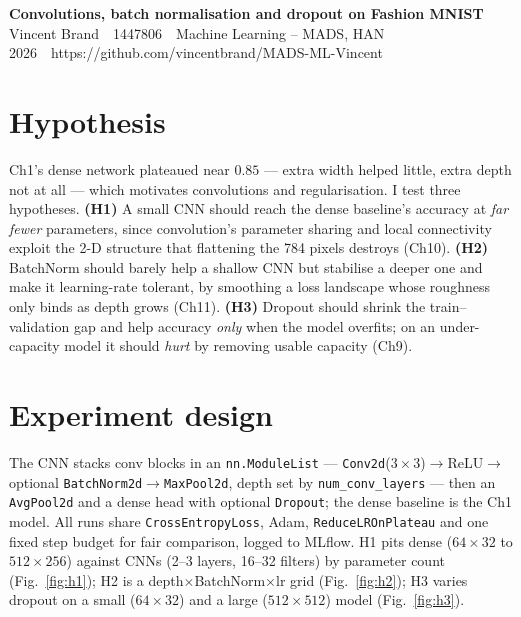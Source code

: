 \documentclass[11pt,a4paper]{article}
\newcommand{\studentname}{Vincent Brand}
\newcommand{\studentnumber}{1447806}
\newcommand{\course}{Machine Learning -- MADS, HAN}
\newcommand{\reportdate}{2026}
\newcommand{\repourl}{https://github.com/vincentbrand/MADS-ML-Vincent}
\begin{document}
\begin{center}
  {\Large\bfseries Convolutions, batch normalisation and dropout on Fashion MNIST}\\[3pt]
  \studentname\ \textbar\ \studentnumber\ \textbar\ \course\\
  \reportdate\ \textbar\ \repourl
\end{center}

\section{Hypothesis}
Ch1's dense network plateaued near $0.85$ --- extra width helped little, extra depth
not at all --- which motivates convolutions and regularisation. I test three
hypotheses. \textbf{(H1)} A small CNN should reach the dense baseline's accuracy at
\emph{far fewer} parameters, since convolution's parameter sharing and local
connectivity exploit the 2-D structure that flattening the 784 pixels destroys
(Ch10). \textbf{(H2)} BatchNorm should barely help a shallow CNN but stabilise a
deeper one and make it learning-rate tolerant, by smoothing a loss landscape whose
roughness only binds as depth grows (Ch11). \textbf{(H3)} Dropout should shrink the
train--validation gap and help accuracy \emph{only} when the model overfits; on an
under-capacity model it should \emph{hurt} by removing usable capacity (Ch9).

\section{Experiment design}
The CNN stacks conv blocks in an \texttt{nn.ModuleList} ---
\texttt{Conv2d}($3\times3$)$\to$ReLU$\to$optional
\texttt{BatchNorm2d}$\to$\texttt{MaxPool2d}, depth set by \texttt{num\_conv\_layers}
--- then an \texttt{AvgPool2d} and a dense head with optional \texttt{Dropout}; the
dense baseline is the Ch1 model. All runs share \texttt{CrossEntropyLoss}, Adam,
\texttt{ReduceLROnPlateau} and one fixed step budget for fair comparison, logged to
MLflow. H1 pits dense ($64\times32$ to $512\times256$) against CNNs (2--3 layers,
16--32 filters) by parameter count (Fig.~\ref{fig:h1}); H2 is a
depth$\times$BatchNorm$\times$lr grid (Fig.~\ref{fig:h2}); H3 varies dropout on a
small ($64\times32$) and a large ($512\times512$) model (Fig.~\ref{fig:h3}).
\end{document}
